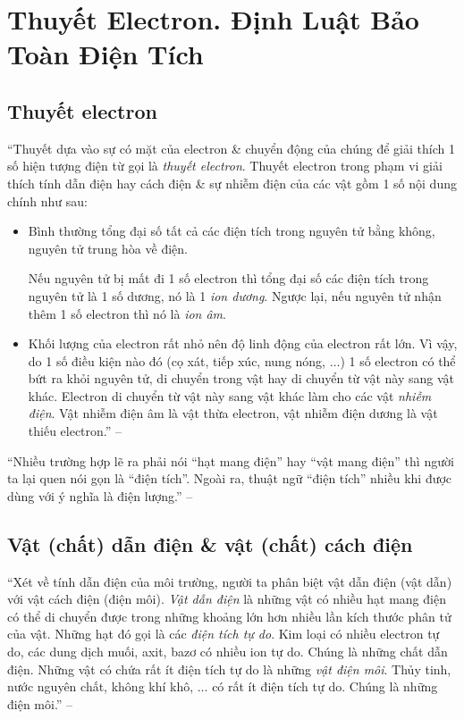 \documentclass[oneside]{book}
\numberwithin{equation}{section}
\begin{document}

\section{Thuyết Electron. Định Luật Bảo Toàn Điện Tích}

\subsection{Thuyết electron}
``Thuyết dựa vào sự có mặt của electron \& chuyển động của chúng để giải thích 1 số hiện tượng điện từ gọi là \textit{thuyết electron}. Thuyết electron trong phạm vi giải thích tính dẫn điện hay cách điện \& sự nhiễm điện của các vật gồm 1 số nội dung chính như sau:
\begin{itemize}
	\item Bình thường tổng đại số tất cả các điện tích trong nguyên tử bằng không, nguyên tử trung hòa về điện.
	
	Nếu nguyên tử bị mất đi 1 số electron thì tổng đại số các điện tích trong nguyên tử là 1 số dương, nó là 1 \textit{ion dương}. Ngược lại, nếu nguyên tử nhận thêm 1 số electron thì nó là \textit{ion âm}.
	\item Khối lượng của electron rất nhỏ nên độ linh động của electron rất lớn. Vì vậy, do 1 số điều kiện nào đó (cọ xát, tiếp xúc, nung nóng, $\ldots$) 1 số electron có thể bứt ra khỏi nguyên tử, di chuyển trong vật hay di chuyển từ vật này sang vật khác. Electron di chuyển từ vật này sang vật khác làm cho các vật \textit{nhiễm điện}. Vật nhiễm điện âm là vật thừa electron, vật nhiễm điện dương là vật thiếu electron.'' -- \cite[p. 10]{SGK_Vat_Ly_11_nang_cao}
\end{itemize}
``Nhiều trường hợp lẽ ra phải nói ``hạt mang điện'' hay ``vật mang điện'' thì người ta lại quen nói gọn là ``điện tích''. Ngoài ra, thuật ngữ ``điện tích'' nhiều khi được dùng với ý nghĩa là điện lượng.'' -- \cite[p. 10]{SGK_Vat_Ly_11_nang_cao}

\subsection{Vật (chất) dẫn điện \& vật (chất) cách điện}
``Xét về tính dẫn điện của môi trường, người ta phân biệt vật dẫn điện (vật dẫn) với vật cách điện (điện môi). \textit{Vật dẫn điện} là những vật có nhiều hạt mang điện có thể di chuyển được trong những khoảng lớn hơn nhiều lần kích thước phân tử của vật. Những hạt đó gọi là các \textit{điện tích tự do}. Kim loại có nhiều electron tự do, các dung dịch muối, axit, bazơ có nhiều ion tự do. Chúng là những chất dẫn điện. Những vật có chứa rất ít điện tích tự do là những \textit{vật điện môi}. Thủy tinh, nước nguyên chất, không khí khô, $\ldots$ có rất ít điện tích tự do. Chúng là những điện môi.'' -- \cite[pp. 10--11]{SGK_Vat_Ly_11_nang_cao}
\end{document}
